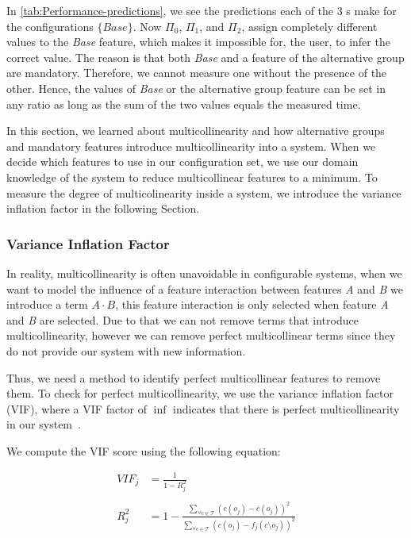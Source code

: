 In \autoref{tab:Performance-predictions}, we see the predictions each of the 3 {\perfInfluenceModel}s make for the configurations $\{Base\}$. 
Now $\Pi_0$, $\Pi_1$, and $\Pi_2$, assign completely different values to the \textit{Base} feature, which makes it impossible for, the user,
to infer the correct value. The reason is that both \textit{Base} and a feature of the alternative group are mandatory. 
Therefore, we cannot measure one without the presence of the other. 
Hence, the values of \textit{Base} or the alternative group feature can be set in any ratio as long as the sum of the two values equals the measured time.

In this section, we learned about multicollinearity and how alternative groups and mandatory features introduce multicollinearity into a system. 
When we decide which features to use in our configuration set, we use our domain knowledge of the system to reduce multicollinear features to a minimum.
To measure the degree of multicolinearity inside a system, we introduce the variance inflation factor in the following Section.

\subsubsection{Variance Inflation Factor}\label{ch:vif}
In reality, multicollinearity is often unavoidable in configurable systems, when we want to model the influence of a feature interaction between features
\textit{A} and \textit{B} we introduce a term $A \cdot B$, this feature interaction is only selected when feature \textit{A} and \textit{B} are selected. 
Due to that we can not remove terms that introduce multicollinearity, however we can remove perfect multicollinear terms since they do not provide our 
system with new information.

Thus, we need a method to identify perfect multicollinear features to remove them.
To check for perfect multicollinearity, we use the variance inflation factor (VIF), where a VIF factor of $\inf$ indicates
that there is perfect multicollinearity in our system~\cite{Multicollinearity}.

We compute the VIF score using the following equation:

\begin{align}
    VIF_{j} &= \frac{1}{1 - R^{2}_{j}}  \\ \nonumber\\
    R^{2}_{j} &= 1 - \frac{\sum\limits_{\forall c \in \mathcal{T}} (c(o_j) - \overline{c}(o_j))^2} {\sum\limits_{\forall c \in \mathcal{T}}(c(o_j) - f_j(c \setminus o_j))^2}
\end{align}

